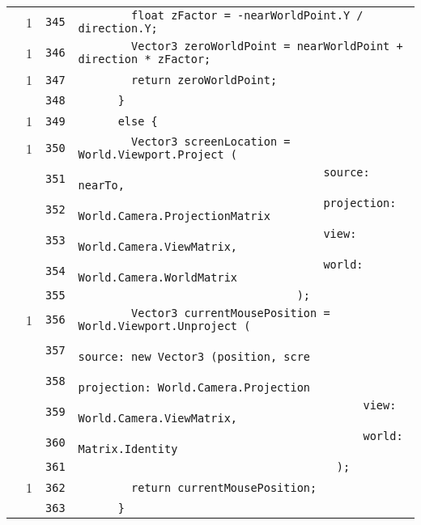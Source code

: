 \documentclass[a4paper,10pt]{article}
\begin{document}
\begin{longtable}[l]{lrrl}
\cellcolor{green} & 1 & \verb~345~ & \verb~        float zFactor = -nearWorldPoint.Y / direction.Y;~\\
\cellcolor{green} & 1 & \verb~346~ & \verb~        Vector3 zeroWorldPoint = nearWorldPoint + direction * zFactor;~\\
\cellcolor{green} & 1 & \verb~347~ & \verb~        return zeroWorldPoint;~\\
\cellcolor{gray} &  & \verb~348~ & \verb~      }~\\
\cellcolor{green} & 1 & \verb~349~ & \verb~      else {~\\
\cellcolor{green} & 1 & \verb~350~ & \verb~        Vector3 screenLocation = World.Viewport.Project (~\\
\cellcolor{gray} &  & \verb~351~ & \verb~                                     source: nearTo,~\\
\cellcolor{gray} &  & \verb~352~ & \verb~                                     projection: World.Camera.ProjectionMatrix~\\
\cellcolor{gray} &  & \verb~353~ & \verb~                                     view: World.Camera.ViewMatrix,~\\
\cellcolor{gray} &  & \verb~354~ & \verb~                                     world: World.Camera.WorldMatrix~\\
\cellcolor{gray} &  & \verb~355~ & \verb~                                 );~\\
\cellcolor{green} & 1 & \verb~356~ & \verb~        Vector3 currentMousePosition = World.Viewport.Unproject (~\\
\cellcolor{gray} &  & \verb~357~ & \verb~                                           source: new Vector3 (position, scre~\\
\cellcolor{gray} &  & \verb~358~ & \verb~                                           projection: World.Camera.Projection~\\
\cellcolor{gray} &  & \verb~359~ & \verb~                                           view: World.Camera.ViewMatrix,~\\
\cellcolor{gray} &  & \verb~360~ & \verb~                                           world: Matrix.Identity~\\
\cellcolor{gray} &  & \verb~361~ & \verb~                                       );~\\
\cellcolor{green} & 1 & \verb~362~ & \verb~        return currentMousePosition;~\\
\cellcolor{gray} &  & \verb~363~ & \verb~      }~\\

\end{longtable}
\end{document}
